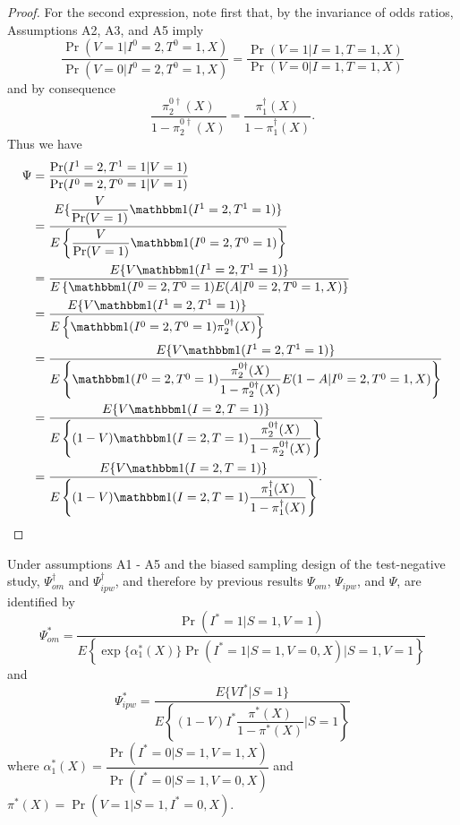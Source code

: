 \begin{appendix}
\begin{proof}
    For the second expression, note first that, by the invariance of odds ratios, Assumptions A2, A3, and A5 imply
    \begin{equation*}
        \dfrac{\Pr(V = 1 | I^0 = 2, T^0 = 1, X)}{\Pr(V = 0 | I^0 = 2,  T^0 = 1, X)} = \dfrac{\Pr(V = 1 | I = 1, T = 1, X)}{\Pr(V = 0 | I = 1,  T = 1, X)}
    \end{equation*}
    and by consequence 
    \begin{equation*}
        \dfrac{\pi^{0\dagger}_2(X)}{1 - \pi^{0\dagger}_2(X)} = \dfrac{\pi^\dagger_1(X)}{1 - \pi^\dagger_1(X)}.
    \end{equation*}
    Thus we have
    \begin{align*}
        \Psi &= \dfrac{\Pr(I^1=2, T^1 = 1|V=1)}{\Pr(I^0=2, T^0 = 1|V=1)} \\
        &= \dfrac{E\{\dfrac{V}{\Pr(V=1)} \mathbbm 1 (I^1 = 2, T^1 = 1)\}}{E\left\{\dfrac{V}{\Pr(V=1)}\mathbbm 1 (I^0 = 2, T^0 = 1)\right\}} \\
        &= \dfrac{E\{V \mathbbm 1 (I^1 = 2, T^1 = 1)\}}{E\left\{\mathbbm 1 (I^0 = 2, T^0 = 1) E(A | I^0 = 2, T^0 = 1, X)\right\}} \\
        &= \dfrac{E\{V \mathbbm 1 (I^1 = 2, T^1 = 1)\}}{E\left\{\mathbbm 1 (I^0 = 2, T^0 = 1) \pi^{0\dagger}_2(X)\right\}} \\
        &= \dfrac{E\{V \mathbbm 1 (I^1 = 2, T^1 = 1)\}}{E\left\{\mathbbm 1 (I^0 = 2, T^0 = 1) \dfrac{\pi^{0\dagger}_2(X)}{1-\pi^{0\dagger}_2(X)}E(1-A|I^0 = 2, T^0 = 1, X)\right\}} \\
        &= \dfrac{E\{V \mathbbm 1 (I = 2, T = 1)\}}{E\left\{(1 - V)\mathbbm 1 (I = 2, T = 1) \dfrac{\pi^{0\dagger}_2(X)}{1-\pi^{0\dagger}_2(X)}\right\}} \\
        &= \dfrac{E\{V \mathbbm 1 (I = 2, T = 1)\}}{E\left\{(1 - V)\mathbbm 1 (I = 2, T = 1) \dfrac{\pi^\dagger_1(X)}{1-\pi^\dagger_1(X)}\right\}}.
    \end{align*}
    \end{proof}
    \newpage 
    \begin{corollary}\label{corollary2}
    Under assumptions A1 - A5 and the biased sampling design of the test-negative study, $\Psi^\dagger_{om}$ and $\Psi^\dagger_{ipw}$, and therefore by previous results $\Psi_{om}$, $\Psi_{ipw}$, and $\Psi$, are identified by
    \begin{equation}
        \Psi_{om}^* = \dfrac{\Pr(I^* = 1 | S = 1, V = 1)}{E\left\{ \exp\{\alpha^*_1(X)\} \Pr(I^* = 1 | S = 1, V = 0, X) \Big| S = 1, V = 1 \right\}}
    \end{equation}
    and 
    \begin{equation}
        \Psi_{ipw}^* = \dfrac{E\{VI^*|S =1\}}{E\left\{ (1 - V) I^* \dfrac{\pi^*(X)}{1 - \pi^*(X)} \bigg| S = 1\right\}}
    \end{equation}
    where $\alpha^*_1(X) = \dfrac{\Pr(I^* = 0 | S = 1, V = 1, X)}{\Pr(I^* = 0| S = 1, V = 0, X)}$ and $\pi^*(X) = \Pr(V = 1| S = 1, I^* = 0, X)$.
    \end{corollary}
    

\end{appendix}
